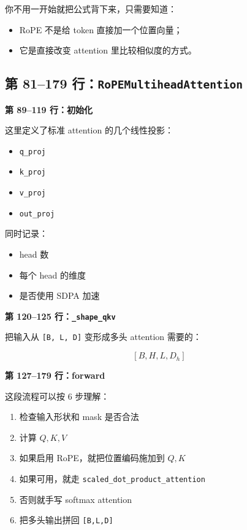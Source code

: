 \documentclass[11pt,a4paper]{ctexart}
\begin{document}
你不用一开始就把公式背下来，只需要知道：

\begin{itemize}[leftmargin=2em]
\item RoPE 不是给 token 直接加一个位置向量；
\item 它是直接改变 attention 里比较相似度的方式。
\end{itemize}

\subsection{第 81--179 行：\texttt{RoPEMultiheadAttention}}

\textbf{第 89--119 行：初始化}

这里定义了标准 attention 的几个线性投影：

\begin{itemize}[leftmargin=2em]
\item \texttt{q\_proj}
\item \texttt{k\_proj}
\item \texttt{v\_proj}
\item \texttt{out\_proj}
\end{itemize}

同时记录：

\begin{itemize}[leftmargin=2em]
\item head 数
\item 每个 head 的维度
\item 是否使用 SDPA 加速
\end{itemize}

\textbf{第 120--125 行：\texttt{\_shape\_qkv}}

把输入从 \texttt{[B, L, D]} 变形成多头 attention 需要的：

\[
[B, H, L, D_h]
\]

\textbf{第 127--179 行：forward}

这段流程可以按 6 步理解：

\begin{enumerate}[leftmargin=2em]
\item 检查输入形状和 mask 是否合法
\item 计算 $Q,K,V$
\item 如果启用 RoPE，就把位置编码施加到 $Q,K$
\item 如果可用，就走 \texttt{scaled\_dot\_product\_attention}
\item 否则就手写 softmax attention
\item 把多头输出拼回 \texttt{[B,L,D]}
\end{enumerate}
\end{document}
